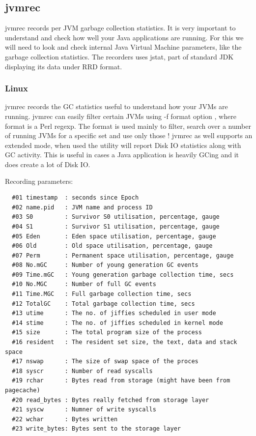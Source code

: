 \subsection*{jvmrec}
jvmrec records per JVM garbage collection statistics. It is very important to
understand and check how well your Java applications are running. For this we
will need to look and check internal Java Virtual Machine parameters, 
like the garbage collection statistics. The recorders uses jstat, part of 
standard JDK displaying its data under RRD format.


\subsubsection{Linux}
jvmrec records the GC statistics useful to understand how your JVMs are
running. jvmrec can easily filter certain JVMs using -f format option 
, where format is a Perl regexp. The format is used mainly to filter,
search over a number of running JVMs for a specific set and use only 
those ! jvmrec as well supports an extended mode, when used the utility 
will report Disk IO statistics along with GC activity. This is useful 
in cases a Java application is heavily GCing and it does create a lot of
Disk IO.

\noindent
Recording parameters:

\begin{verbatim}
  #01 timestamp  : seconds since Epoch
  #02 name.pid   : JVM name and process ID
  #03 S0         : Survivor S0 utilisation, percentage, gauge
  #04 S1         : Survivor S1 utilisation, percentage, gauge
  #05 Eden       : Eden space utilisation, percentage, gauge
  #06 Old        : Old space utilisation, percentage, gauge
  #07 Perm       : Permanent space utilisation, percentage, gauge
  #08 No.mGC     : Number of young generation GC events
  #09 Time.mGC   : Young generation garbage collection time, secs
  #10 No.MGC     : Number of full GC events
  #11 Time.MGC   : Full garbage collection time, secs
  #12 TotalGC    : Total garbage collection time, secs
  #13 utime      : The no. of jiffies scheduled in user mode
  #14 stime      : The no. of jiffies scheduled in kernel mode
  #15 size       : The total program size of the process
  #16 resident   : The resident set size, the text, data and stack space
  #17 nswap      : The size of swap space of the proces
  #18 syscr      : Number of read syscalls
  #19 rchar      : Bytes read from storage (might have been from pagecache)
  #20 read_bytes : Bytes really fetched from storage layer
  #21 syscw      : Numner of write syscalls
  #22 wchar      : Bytes written
  #23 write_bytes: Bytes sent to the storage layer
\end{verbatim}


